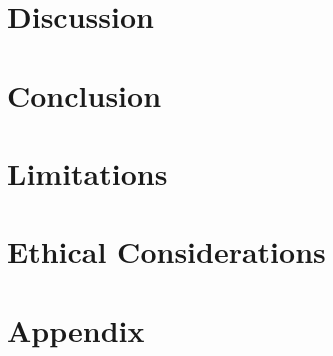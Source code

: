 \documentclass{article}
\begin{document}
\section{Discussion}

\section{Conclusion}

\section{Limitations}

\section{Ethical Considerations}




\appendix
\section{Appendix}
\end{document}
